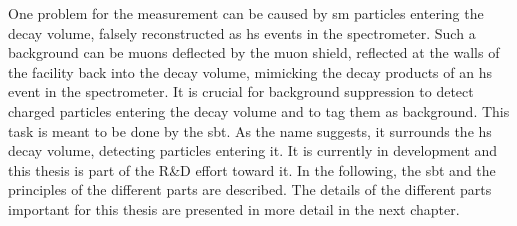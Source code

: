 One problem for the measurement can be caused by \ac{sm} particles entering the decay volume, falsely reconstructed as \ac{hs} events in the spectrometer.
Such a background can be muons deflected by the muon shield, reflected at the walls of the facility back into the decay volume, mimicking the decay products of an \ac{hs} event in the spectrometer.
It is crucial for background suppression to detect charged particles entering the decay volume and to tag them as background.
This task is meant to be done by the \ac{sbt}.
As the name suggests, it surrounds the \ac{hs} decay volume, detecting particles entering it.
It is currently in development and this thesis is part of the R\&D effort toward it.
In the following, the \ac{sbt} and the principles of the different parts are described.
The details of the different parts important for this thesis are presented in more detail in the next chapter.

